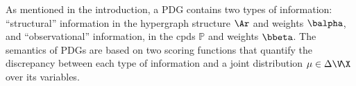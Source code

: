 As mentioned in the introduction, a PDG contains two types of information:
``structural'' information in the hypergraph structure $\Ar$ and
weights $\balpha$, and ``observational'' information, 
in the cpds 
$\mathbb P$ and weights $\bbeta$.
The semantics of PDGs are based on two scoring functions
that quantify the discrepancy between 
each type of information and a joint distribution
$\mu \in \Delta \V \!\X$ over its variables.

